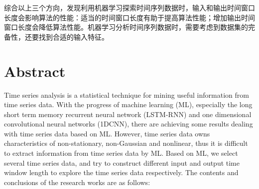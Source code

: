 \begin{enumerate}
  综合以上三个方向，发现利用机器学习探索时间序列数据时，输入和输出时间窗口长度会影响算法的性能：适当的时间窗口长度有助于提高算法性能；增加输出时间窗口长度会降低算法性能。机器学习分析时间序列数据时，需要考虑到数据集的完备性，还要找到合适的输入特征。

\end{enumerate}


\intobmk\chapter*{Abstract}
Time series analysis is a statistical technique for mining useful information from time series data. With the progress of machine learning (ML), especially the long short term memory recurrent neural network (LSTM-RNN) and one dimensional convolutional neural networks (1DCNN), there are achieving some results dealing with time series data based on ML. However, time series data owns characteristics of non-stationary, non-Gaussian and nonlinear, thus it is difficult to extract information from time series data by ML. Based on ML, we select several time series data, and try to construct different input and output time window length to explore the time series data respectively. The contents and conclusions of the research works are as follows:
